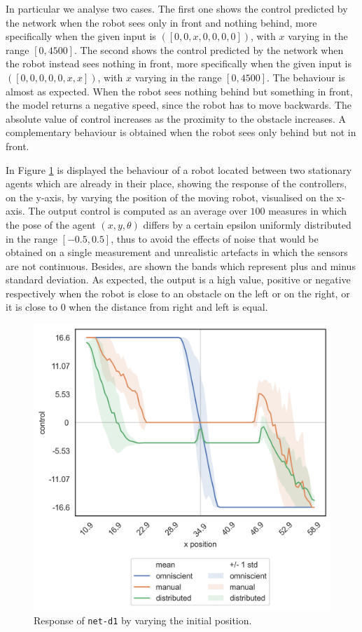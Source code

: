 In particular we analyse two cases. The first one shows the control predicted by 
the network when the robot sees only in front and nothing behind, more 
specifically when the given input is  $([0, 0, x, 0, 0, 0, 0])$, with $x$ varying in the 
range $[0, 4500]$.
The second shows the control predicted by the network when the robot instead 
sees nothing in front, more specifically when the given input is  $([0, 0, 0, 0, 0,x , 
x])$, with $x$ varying in the range $[0, 4500]$.
The behaviour is almost as expected. When the robot sees nothing behind but 
something in front, the model returns a negative speed, since the robot has to 
move backwards. 
The absolute value of control increases as the proximity to the obstacle increases.
A complementary behaviour is obtained when the robot sees only behind but 
not in front.

\bigskip
In Figure \ref{fig:net-d1responseposition} is displayed the behaviour of a robot 
located between two stationary agents which are already in their place, showing 
the response of the controllers, on the y-axis, by varying the position of the 
moving robot, visualised on the x-axis. The output control is computed as an 
average over $100$ measures in which the pose of the agent $(x, y, \theta)$ 
differs by a certain epsilon uniformly distributed in the range $[-0.5, 0.5]$, thus 
to avoid the effects of noise that would be obtained on a single measurement and 
unrealistic artefacts in which the sensors are not continuous. Besides, are shown 
the bands which represent plus and minus standard deviation. As expected, the 
output is a high value, positive or negative respectively when the robot is close to 
an obstacle on the left or on the right, or it is close to $0$ when the distance from 
right and left is equal.
\begin{figure}[!htb]
	\centering
	\includegraphics[width=.45\textwidth]{contents/images/net-d1/response-varying_init_position-distributed}%
	\caption{Response of \texttt{net-d1} by varying the initial position.}
	\label{fig:net-d1responseposition}
\end{figure}

